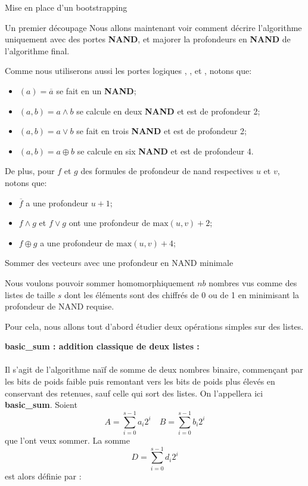 \begin{section}{Mise en place d'un bootstrapping}
\begin{subsection}{Un premier découpage}
	Nous allons maintenant voir comment décrire l'algorithme uniquement avec des portes \textbf{NAND}, et majorer la profondeurs en \textbf{NAND} de l'algorithme final.

	Comme nous utiliserons aussi les portes logiques , ,  et , notons que:
\begin{itemize}
\item {}$(a) = \overline{a}$ se fait en un \textbf{NAND};
\item {}$(a, b) = a \land b$ se calcule en deux \textbf{NAND} et est de
	profondeur 2;
\item {}$(a, b) = a \lor b$ se fait en trois \textbf{NAND} et est de
	profondeur 2;
\item {}$(a, b) = a \oplus b$ se calcule en six \textbf{NAND} et est de
	profondeur 4.
\end{itemize}
De plus, pour $f$ et $g$ des formules de profondeur de nand respectives $u$ et
$v$, notons que:
\begin{itemize}
\item $\overline{f}$ a une profondeur $u+1$;
\item $f \land g$ et $f \lor g$ ont une profondeur de $\text{max}(u,v) + 2$;
\item $f \oplus g$ a une profondeur de $\text{max}(u,v) + 4$;
\end{itemize}
\end{subsection}
\begin{subsection}{Sommer des vecteurs avec une profondeur en NAND minimale}

	Nous voulons pouvoir sommer homomorphiquement $nb$ nombres vus comme des listes de taille $s$ dont les éléments sont des chiffrés de 0 ou de 1 en minimisant la profondeur de NAND requise. 

	Pour cela, nous allons tout d'abord étudier deux opérations simples sur des listes.

\vspace{0.3cm}
\noindent
\textbf{basic\_sum : addition classique de deux listes :}
\paragraph{}
	Il s'agit de l'algorithme naïf de somme de deux nombres binaire, commençant par les bits de poids faible puis remontant vers les bits de poids plus élevés en conservant des retenues, sauf celle qui \og sort \fg des listes. On l'appellera ici \textbf{basic\_sum}. Soient 
\[ A = \sum_{i=0}^{s-1} a_i 2^i \quad B = \sum_{i=0}^{s-1} b_i 2^i\]
que l'ont veux sommer. La somme
\[D =\sum_{i=0}^{s-1} d_i 2^i\]
est alors définie par :
	

\end{subsection}
\end{section}
